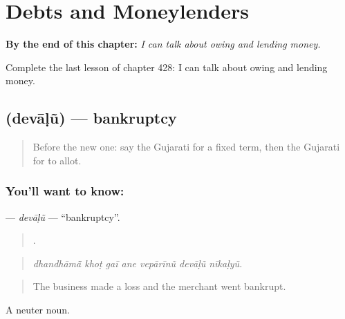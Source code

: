 
\chapter{Debts and Moneylenders}
\label{ch:gu-debts-and-moneylenders}

\begin{chapteropening}
\textbf{By the end of this chapter:} \emph{I can talk about owing and lending money.}

Complete the last lesson of chapter 428: I can talk about owing and lending money.
\end{chapteropening}

\section[\texorpdfstring{\gu{દેવાળું} (devāḷũ)}{દેવાળું (devāḷũ)}]{ (devāḷũ) — bankruptcy}

\label{lesson:GU-C428-devalu}



\begin{quote}
Before the new one: say the Gujarati for a fixed term, then the Gujarati for to allot.
\end{quote}

\subsection*{You'll want to know: }
\textbf{} — \emph{devāḷũ} — \textquotedblleft{}bankruptcy\textquotedblright{}.

\begin{quote}
      .
\end{quote}

\begin{quote}
\emph{dhandhāmā̃ khoṭ gaī ane vepārīnũ devāḷũ nīkaḷyũ.}
\end{quote}

\begin{quote}
The business made a loss and the merchant went bankrupt.
\end{quote}

A neuter noun.

